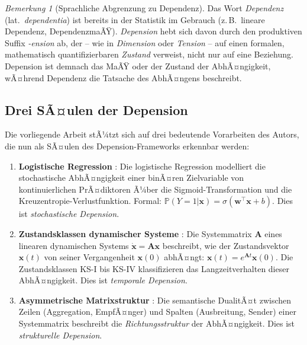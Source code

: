 ﻿\documentclass[12pt, a4paper]{article}
\theoremstyle{definition}
\theoremstyle{remark}
\newtheorem{remark}[theorem]{Bemerkung}
\newcommand{\Prob}{\mathbb{P}}
\newcommand{\sigmoid}{\sigma}
\newcommand{\vw}{\bm{w}}
\newcommand{\vx}{\bm{x}}
\newcommand{\vA}{\bm{A}}
\newcommand{\T}{\top}
\begin{document}
\begin{remark}[Sprachliche Abgrenzung zu Dependenz]
  Das Wort \emph{Dependenz} (lat.\ \emph{dependentia}) ist bereits in der Statistik
  im Gebrauch (z.\,B.\ lineare Dependenz, DependenzmaÃŸ). \emph{Depension} hebt
  sich davon durch den produktiven Suffix \emph{-ension} ab, der -- wie in
  \emph{Dimension} oder \emph{Tension} -- auf einen formalen, mathematisch
  quantifizierbaren \emph{Zustand} verweist, nicht nur auf eine Beziehung.
  Depension ist demnach das MaÃŸ oder der Zustand der AbhÃ¤ngigkeit, wÃ¤hrend
  Dependenz die Tatsache des AbhÃ¤ngens beschreibt.
\end{remark}

\subsection{Drei SÃ¤ulen der Depension}

Die vorliegende Arbeit stÃ¼tzt sich auf drei bedeutende Vorarbeiten des Autors, die
nun als SÃ¤ulen des Depension-Frameworks erkennbar werden:

\begin{enumerate}[label=(\Roman*)]
  \item \textbf{Logistische Regression} \citep{epp2026logreg}: Die logistische
    Regression modelliert die stochastische AbhÃ¤ngigkeit einer binÃ¤ren Zielvariable
    von kontinuierlichen PrÃ¤diktoren Ã¼ber die Sigmoid-Transformation und die
    Kreuzentropie-Verlustfunktion. Formal: $\Prob(Y=1|\vx) = \sigmoid(\vw^\T\vx + b)$.
    Dies ist \emph{stochastische Depension}.

  \item \textbf{Zustandsklassen dynamischer Systeme} \citep{epp2026sysstate}: Die
    Systemmatrix $\vA$ eines linearen dynamischen Systems $\dot{\vx} = \vA\vx$
    beschreibt, wie der Zustandsvektor $\vx(t)$ von seiner Vergangenheit
    $\vx(0)$ abhÃ¤ngt: $\vx(t) = e^{\vA t}\vx(0)$. Die Zustandsklassen KS-I bis
    KS-IV klassifizieren das Langzeitverhalten dieser AbhÃ¤ngigkeit.
    Dies ist \emph{temporale Depension}.

  \item \textbf{Asymmetrische Matrixstruktur} \citep{epp2026systemth}: Die
    semantische DualitÃ¤t zwischen Zeilen (Aggregation, EmpfÃ¤nger) und Spalten
    (Ausbreitung, Sender) einer Systemmatrix beschreibt die \emph{Richtungs\-struktur}
    der AbhÃ¤ngigkeit. Dies ist \emph{strukturelle Depension}.
\end{enumerate}
\end{document}
